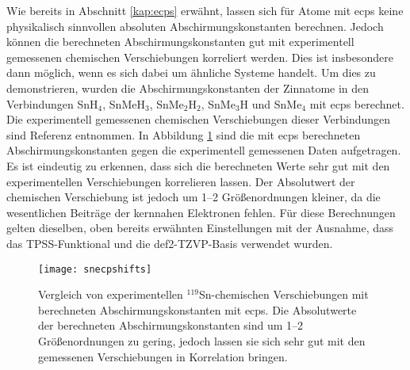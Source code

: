 Wie bereits in Abschnitt \ref{kap:ecps} erwähnt, lassen sich für Atome mit \acp{ecp} keine physikalisch sinnvollen absoluten Abschirmungskonstanten berechnen. Jedoch können die berechneten Abschirmungskonstanten gut mit experimentell gemessenen chemischen Verschiebungen korreliert werden. Dies ist insbesondere dann möglich, wenn es sich dabei um ähnliche Systeme handelt. Um dies zu demonstrieren, wurden die Abschirmungskonstanten der Zinnatome in den Verbindungen SnH$_4$, SnMeH$_3$, SnMe$_2$H$_2$, SnMe$_3$H und SnMe$_4$ mit \acp{ecp} berechnet. Die experimentell gemessenen chemischen Verschiebungen dieser Verbindungen sind Referenz \cite{vivas2002dft} entnommen. In Abbildung \ref{abb:snecpshifts} sind die mit \acp{ecp} berechneten Abschirmungskonstanten gegen die experimentell gemessenen Daten aufgetragen. Es ist eindeutig zu erkennen, dass sich die berechneten Werte sehr gut mit den experimentellen Verschiebungen korrelieren lassen. Der Absolutwert der chemischen Verschiebung ist jedoch um 1--2 Größenordnungen kleiner, da die wesentlichen Beiträge der kernnahen Elektronen fehlen. Für diese Berechnungen gelten dieselben, oben bereits erwähnten Einstellungen mit der Ausnahme, dass das TPSS-Funktional\supercite{tao2003climbing} und die def2-TZVP-Basis\supercite{weigend2005balanced} verwendet wurden.
\begin{figure}[ht!]
	\centering
	\texttt{[image: snecpshifts]}
	\captionsetup{figurewithin = chapter}
	\captionsetup{font=small, labelfont=bf}\caption[Vergleich von experimentellen $^{119}$Sn-chemischen Verschiebungen mit berechneten Abschirmungskonstanten]{Vergleich von experimentellen $^{119}$Sn-chemischen Verschiebungen mit berechneten Abschirmungskonstanten mit \acp{ecp}. Die Absolutwerte der berechneten Abschirmungskonstanten sind um 1--2 Größenordnungen zu gering, jedoch lassen sie sich sehr gut mit den gemessenen Verschiebungen in Korrelation bringen.}
\label{abb:snecpshifts}
\end{figure}
	
